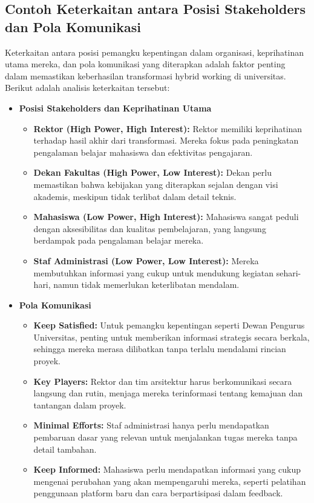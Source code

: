 \subsection*{Contoh Keterkaitan antara Posisi Stakeholders dan Pola Komunikasi}

Keterkaitan antara posisi pemangku kepentingan dalam organisasi, keprihatinan utama mereka, dan pola komunikasi yang diterapkan adalah faktor penting dalam memastikan keberhasilan transformasi hybrid working di universitas. Berikut adalah analisis keterkaitan tersebut:

\begin{itemize}
	\item \textbf{Posisi Stakeholders dan Keprihatinan Utama}
	\begin{itemize}
		\item \textbf{Rektor (High Power, High Interest):} Rektor memiliki keprihatinan terhadap hasil akhir dari transformasi. Mereka fokus pada peningkatan pengalaman belajar mahasiswa dan efektivitas pengajaran.
		\item \textbf{Dekan Fakultas (High Power, Low Interest):} Dekan perlu memastikan bahwa kebijakan yang diterapkan sejalan dengan visi akademis, meskipun tidak terlibat dalam detail teknis. 
		\item \textbf{Mahasiswa (Low Power, High Interest):} Mahasiswa sangat peduli dengan aksesibilitas dan kualitas pembelajaran, yang langsung berdampak pada pengalaman belajar mereka.
		\item \textbf{Staf Administrasi (Low Power, Low Interest):} Mereka membutuhkan informasi yang cukup untuk mendukung kegiatan sehari-hari, namun tidak memerlukan keterlibatan mendalam.
	\end{itemize}
	
	\item \textbf{Pola Komunikasi}
	\begin{itemize}
		\item \textbf{Keep Satisfied:} Untuk pemangku kepentingan seperti Dewan Pengurus Universitas, penting untuk memberikan informasi strategis secara berkala, sehingga mereka merasa dilibatkan tanpa terlalu mendalami rincian proyek.
		\item \textbf{Key Players:} Rektor dan tim arsitektur harus berkomunikasi secara langsung dan rutin, menjaga mereka terinformasi tentang kemajuan dan tantangan dalam proyek.
		\item \textbf{Minimal Efforts:} Staf administrasi hanya perlu mendapatkan pembaruan dasar yang relevan untuk menjalankan tugas mereka tanpa detail tambahan.
		\item \textbf{Keep Informed:} Mahasiswa perlu mendapatkan informasi yang cukup mengenai perubahan yang akan mempengaruhi mereka, seperti pelatihan penggunaan platform baru dan cara berpartisipasi dalam feedback.
	\end{itemize}
	

\end{itemize}

